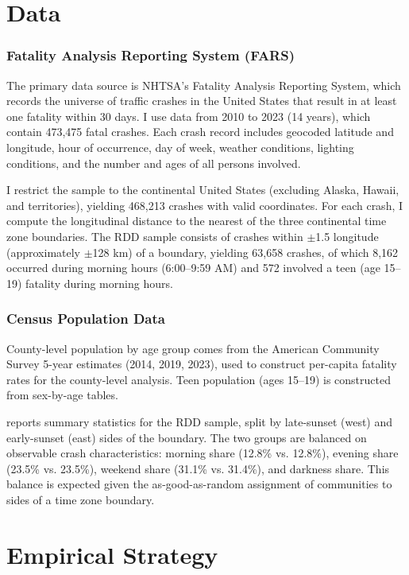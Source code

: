 \documentclass[12pt]{article}
\begin{document}
\section{Data}

\subsubsection*{Fatality Analysis Reporting System (FARS)} The primary data source is NHTSA's Fatality Analysis Reporting System, which records the universe of traffic crashes in the United States that result in at least one fatality within 30 days. I use data from 2010 to 2023 (14 years), which contain 473,475 fatal crashes. Each crash record includes geocoded latitude and longitude, hour of occurrence, day of week, weather conditions, lighting conditions, and the number and ages of all persons involved.

I restrict the sample to the continental United States (excluding Alaska, Hawaii, and territories), yielding 468,213 crashes with valid coordinates. For each crash, I compute the longitudinal distance to the nearest of the three continental time zone boundaries. The RDD sample consists of crashes within $\pm$1.5\textdegree{} longitude (approximately $\pm$128 km) of a boundary, yielding 63,658 crashes, of which 8,162 occurred during morning hours (6:00--9:59 AM) and 572 involved a teen (age 15--19) fatality during morning hours.

\subsubsection*{Census Population Data} County-level population by age group comes from the American Community Survey 5-year estimates (2014, 2019, 2023), used to construct per-capita fatality rates for the county-level analysis. Teen population (ages 15--19) is constructed from sex-by-age tables.



 reports summary statistics for the RDD sample, split by late-sunset (west) and early-sunset (east) sides of the boundary. The two groups are balanced on observable crash characteristics: morning share (12.8\% vs. 12.8\%), evening share (23.5\% vs. 23.5\%), weekend share (31.1\% vs. 31.4\%), and darkness share. This balance is expected given the as-good-as-random assignment of communities to sides of a time zone boundary.

\section{Empirical Strategy}
\end{document}
